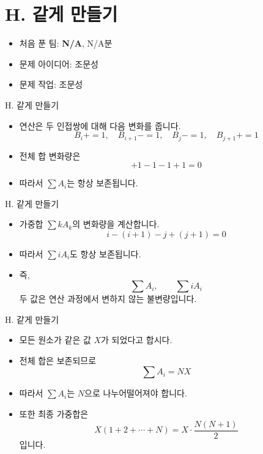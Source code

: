 \def\probno{H}
\def\probtitle{같게 만들기}

\section{\probno{}. \probtitle{}}

\begin{frame}
    \sectiontitle{\probno{}}{\probtitle{}}
    \begin{itemize}
        \item 처음 푼 팀: \textbf{N/A}, N/A분
        \item 문제 아이디어: 조문성
        \item 문제 작업: 조문성
    \end{itemize}
\end{frame}

\begin{frame}{\probno{}. \probtitle{}}
    \begin{itemize}
        \item 연산은 두 인접쌍에 대해 다음 변화를 줍니다.
        \[
            B_i{+}{=}1,\quad B_{i+1}{-}{=}1,\quad
            B_j{-}{=}1,\quad B_{j+1}{+}{=}1
        \]
        \item 전체 합 변화량은
        \[
            +1-1-1+1=0
        \]
        \item 따라서 $\sum A_i$는 항상 보존됩니다.
    \end{itemize}
\end{frame}

\begin{frame}{\probno{}. \probtitle{}}
    \begin{itemize}
        \item 가중합 $\sum kA_k$의 변화량을 계산합니다.
        \[
            i-(i+1)-j+(j+1)=0
        \]
        \item 따라서 $\sum iA_i$도 항상 보존됩니다.
        \item 즉,
        \[
            \sum A_i,\qquad \sum iA_i
        \]
        두 값은 연산 과정에서 변하지 않는 불변량입니다.
    \end{itemize}
\end{frame}

\begin{frame}{\probno{}. \probtitle{}}
    \begin{itemize}
        \item 모든 원소가 같은 값 $X$가 되었다고 합시다.
        \item 전체 합은 보존되므로
        \[
            \sum A_i = NX
        \]
        \item 따라서 $\sum A_i$는 $N$으로 나누어떨어져야 합니다.
        \item 또한 최종 가중합은
        \[
            X(1+2+\cdots+N)
            =
            X\cdot\frac{N(N+1)}{2}
        \]
        입니다.
    \end{itemize}
\end{frame}

